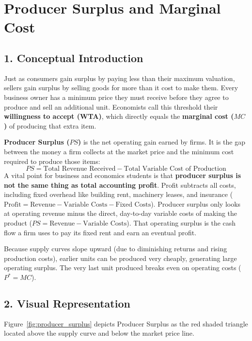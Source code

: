 \documentclass[11pt,letterpaper]{article}
\begin{document}
\section{Producer Surplus and Marginal Cost}

\subsection*{1. Conceptual Introduction}
Just as consumers gain surplus by paying less than their maximum valuation, sellers gain surplus by selling goods for more than it cost to make them. Every business owner has a minimum price they must receive before they agree to produce and sell an additional unit. Economists call this threshold their \textbf{willingness to accept (WTA)}, which directly equals the \textbf{marginal cost ($MC$)} of producing that extra item.

\textbf{Producer Surplus ($PS$)} is the net operating gain earned by firms. It is the gap between the money a firm collects at the market price and the minimum cost required to produce those items:
\begin{equation}
PS = \text{Total Revenue Received} - \text{Total Variable Cost of Production}
\end{equation}
A vital point for business and economics students is that \textbf{producer surplus is not the same thing as total accounting profit}. Profit subtracts all costs, including fixed overhead like building rent, machinery leases, and insurance ($\text{Profit} = \text{Revenue} - \text{Variable Costs} - \text{Fixed Costs}$). Producer surplus only looks at operating revenue minus the direct, day-to-day variable costs of making the product ($PS = \text{Revenue} - \text{Variable Costs}$). That operating surplus is the cash flow a firm uses to pay its fixed rent and earn an eventual profit.

Because supply curves slope upward (due to diminishing returns and rising production costs), earlier units can be produced very cheaply, generating large operating surplus. The very last unit produced breaks even on operating costs ($P^* = MC$).

\subsection*{2. Visual Representation}
Figure~\ref{fig:producer_surplus} depicts Producer Surplus as the red shaded triangle located above the supply curve and below the market price line.
\end{document}
